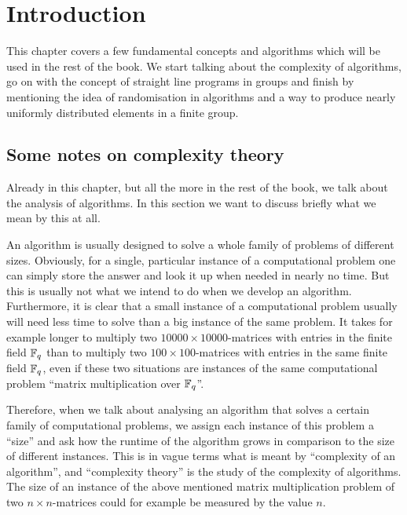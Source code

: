 
\chapter{Introduction}
\label{chap:intro}

This chapter covers a few fundamental concepts and algorithms which
will be used in the rest of the book. We start talking about the
complexity of algorithms, go on with the concept of straight line
programs in groups and finish by mentioning the idea of randomisation
in algorithms and a way to produce nearly uniformly distributed
elements in a finite group.

\section{Some notes on complexity theory}
\label{sec:complexity}

%
Already in this chapter, but all the more in the rest of the book, we
talk about the analysis of algorithms. In this section we want to
discuss briefly what we mean by this at all.

An algorithm is usually designed to solve a whole family of problems of
different sizes. Obviously, for a single, particular instance of a
computational problem one can simply store the answer and look it up
when needed in nearly no time. But this is usually not what we intend
to do when we develop an algorithm. Furthermore, it is clear that a
small instance of a computational problem usually will need less time
to solve than a big instance of the same problem. It takes for example longer 
to multiply two $10000\times 10000$-matrices with entries in the finite 
field $\mathbb{F}_q$ than to multiply two $100\times 100$-matrices
with entries in the same finite field $\mathbb{F}_q$,
even if these two situations are instances of the same
computational problem ``matrix multiplication over $\mathbb{F}_q$''.

Therefore, when we talk about analysing an algorithm that solves a
certain family of computational problems, we assign each instance of
this problem a ``size'' and ask how the runtime of the algorithm grows
in comparison to the size of different instances. This is in vague terms
what is meant by ``complexity of an algorithm'', and ``complexity
%
theory'' is the study of the complexity of algorithms. The size of an
instance of the above mentioned matrix multiplication problem of two $n
\times n$-matrices could for example be measured by the value $n$.

